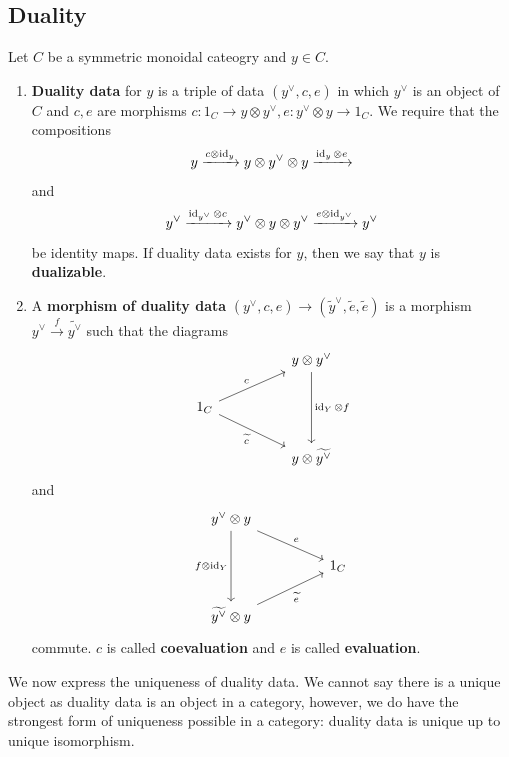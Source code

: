 \subsection{Duality}
\begin{definition}[]
    Let $C$ be a symmetric monoidal cateogry and $y \in C$. 
    \begin{enumerate}[label=(\roman*)]
    \setlength\itemsep{-.2em}
\item \textbf{Duality data} for $y$ is a triple of data $(y ^{\vee},c,e)$ in which $y^{\vee}$ is an object of $C$ and $c,e$ are morphisms $c \colon 1_C \to y\otimes y^{\vee}, e \colon y ^{\vee} \otimes y\to 1_C$. We require that the compositions \[
y \xrightarrow{c\otimes\operatorname{id}_y} y\otimes y^{\vee}\otimes y\xrightarrow{\operatorname{id}_y \otimes e} 
\] and \[
y ^{\vee}\xrightarrow{\operatorname{id}_{y^{\vee}} \otimes c} y ^{\vee}\otimes y \otimes y ^{\vee}\xrightarrow{e \otimes \operatorname{id}_{y ^{\vee}} } y ^{\vee}
\] be identity maps. If duality data exists for $y$, then we say that $y$ is \textbf{dualizable}.
\item A \textbf{morphism of duality data} $(y^{\vee},c,e) \to (\widetilde y ^{\vee},\widetilde e,\widetilde e)$ is a morphism $y^{\vee}\xrightarrow f \widetilde {y ^{\vee}} $ such that the diagrams \[
\begin{tikzcd}
                                                  &  & y\otimes y^{\vee} \arrow[dd, "\id_Y\otimes f"] \\
1_C \arrow[rru, "c"] \arrow[rrd, "\widetilde c"'] &  &                                                \\
                                                  &  & y \otimes \widetilde{y^{\vee}}                
\end{tikzcd}
\] and \[
\begin{tikzcd}
 y^{\vee}\otimes y \arrow[dd, "f\otimes \id_Y"'] \arrow[rrd, "e"] &  &     \\
                                                                  &  & 1_C \\
\widetilde{y^{\vee}}\otimes y \arrow[rru, "\widetilde e"']        &  &    
\end{tikzcd}
\] commute. $c$ is called \textbf{coevaluation} and $e$ is called \textbf{evaluation}. 
    \end{enumerate}
\end{definition}
We now express the uniqueness of duality data. We cannot say there is a unique object as duality data is an object in a category, however, we do have the strongest form of uniqueness possible in a category: duality data is unique up to unique isomorphism.
